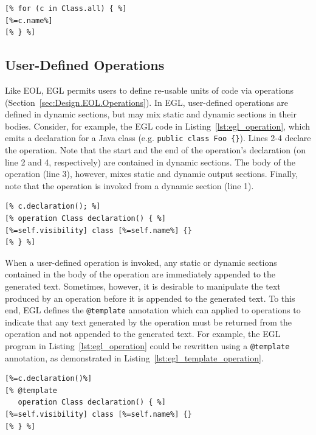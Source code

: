 \begin{lstlisting}[float=tbp, caption=Generating the name of each Class contained in an input model., label=lst:oo, language=EGL]
[% for (c in Class.all) { %]
[%=c.name%]
[% } %]
\end{lstlisting}

\subsection{User-Defined Operations}
Like EOL, EGL permits users to define re-usable units of code via operations (Section~\ref{sec:Design.EOL.Operations}). In EGL, user-defined operations  
are defined in dynamic sections, but may mix static and dynamic sections in their
bodies. Consider, for example, the EGL code in Listing~\ref{lst:egl_operation}, 
which emits a declaration for a Java class (e.g. \texttt{public class Foo \{\}}).
Lines 2-4 declare the operation. Note that the start and the end of the operation's 
declaration (on line 2 and 4, respectively) are contained in dynamic sections. The
body of the operation (line 3), however, mixes static and dynamic output sections.
Finally, note that the operation is invoked from a dynamic section (line 1).

\begin{lstlisting}[float=tbp, caption=Using an operation to specify the text generated for a declaration of a Java class., label=lst:egl_operation, language=EGL]
[% c.declaration(); %]
[% operation Class declaration() { %]
[%=self.visibility] class [%=self.name%] {}
[% } %]
\end{lstlisting}

When a user-defined operation is invoked, any static or dynamic sections contained 
in the body of the operation are immediately appended to the generated text. Sometimes, 
however, it is desirable to manipulate the text produced by an operation before it is
appended to the generated text. To this end, EGL defines the \texttt{@template} annotation
which can applied to operations to indicate that any text generated by the operation
must be returned from the operation and not appended to the generated text. For example,
the EGL program in Listing~\ref{lst:egl_operation} could be rewritten using a \texttt{@template}
annotation, as demonstrated in Listing~\ref{lst:egl_template_operation}.

\begin{lstlisting}[float=tbp, caption=Using a template operation to specify the text generated for a declaration of a Java class., label=lst:egl_template_operation, language=EGL]
[%=c.declaration()%]
[% @template
   operation Class declaration() { %]
[%=self.visibility] class [%=self.name%] {}
[% } %]
\end{lstlisting}

